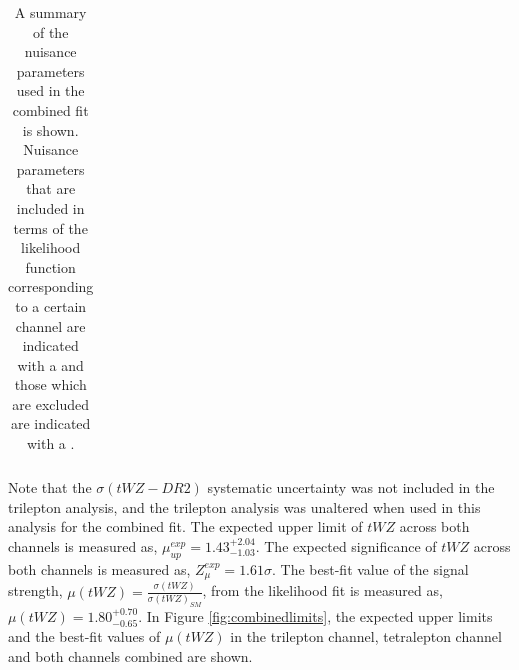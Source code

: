 \begin{table}[h!]
{\begin{tabular}{c|c|c}
\hline

\end{tabular}}
\centering
\caption{A summary of the nuisance parameters used in the combined fit is shown. Nuisance parameters that are included in terms of the likelihood function corresponding to a certain channel are indicated with a \cmark and those which are excluded are indicated with a \xmark.}
\label{tab:NP-combined}
\end{table}
Note that the $\sigma (tWZ-DR2)$ systematic uncertainty was not included in the trilepton analysis, and the trilepton analysis was unaltered when used in this analysis for the combined fit. The expected upper limit of $tWZ$ across both channels is measured as, $\mu_{up}^{exp} = 1.43^{+2.04}_{-1.03}$. The expected significance of $tWZ$ across both channels is measured as, $ Z_{\mu}^{exp} =   1.61\sigma$. The best-fit value of the signal strength, $\mu (tWZ)= \frac{\sigma(tWZ)}{\sigma(tWZ)_{SM}}$, from the likelihood fit is measured as, $\mu (tWZ) =   1.80^{+0.70}_{-0.65}$. In Figure \ref{fig:combinedlimits}, the expected upper limits and the best-fit values of $\mu (tWZ)$ in the trilepton channel, tetralepton channel and both channels combined are shown.
